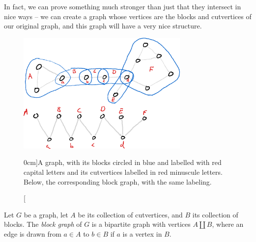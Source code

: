 \documentclass[nobib]{tufte-handout}
\begin{document}
In fact, we can prove something much stronger than just that they intersect in nice ways -- we can create a graph whose vertices are the blocks and cutvertices of our original graph, and this graph will have a very nice structure.

\begin{figure}
  \centering
  \includegraphics[width=0.75\textwidth]{graphics/L10_connectivity/graph_with_blockgraph.png}
  \caption[][0cm]{A graph, with its blocks circled in blue and labelled with red capital letters and its cutvertices labelled in red minuscule letters. Below, the corresponding block graph, with the same labeling.}
  \label{fig:graph_with_blockgraph}
\end{figure}

\begin{definition}
  Let $G$ be a graph, let $A$ be its collection of cutvertices, and $B$ its collection of blocks. The \emph{block graph} of $G$ is a bipartite graph with vertices $A \coprod B$, where an edge is drawn from $a\in A$ to $b\in B$ if $a$ is a vertex in $B$.
\end{definition}
\end{document}
